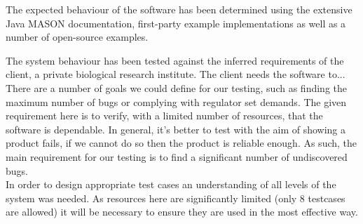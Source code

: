 \documentclass[11pt]{article}
\begin{document}
The expected behaviour of the software has been determined using the extensive Java MASON documentation\cite{mason_doc}, first-party example implementations as well as a number of open-source examples\cite{ppsim}.

The system behaviour has been tested against the inferred requirements of the client, a private biological research institute.
The client needs the software to...
\\

There are a number of goals we could define for our testing, such as finding the maximum number of bugs or complying with regulator set demands. The given requirement here is to verify, with a limited number of resources, that the software is dependable.
In general, it's better to test with the aim of showing a product fails, if we cannot do so then the product is reliable enough\cite[pp. 20]{lessons_book}. As such, the main requirement for our testing is to find a significant number of undiscovered bugs.
\\

In order to design appropriate test cases an understanding of all levels of the system was needed. As resources here are significantly limited (only 8 testcases are allowed) it will be necessary to ensure they are used in the most effective way.
\end{document}
